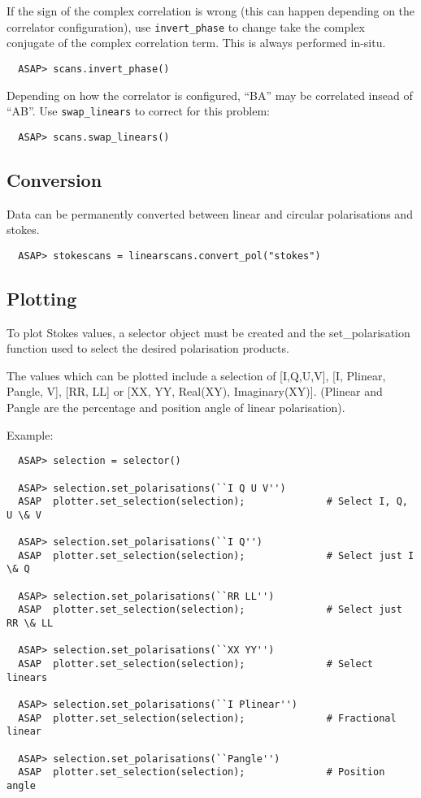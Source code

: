 \documentclass[11pt]{article}
\newcommand{\cmd}[1]{{\tt #1}}
\begin{document}
If the sign of the complex correlation is wrong (this can happen
depending on the correlator configuration), use \cmd{invert\_phase} to
change take the complex conjugate of the complex correlation
term. This is always performed in-situ.

\begin{verbatim}
  ASAP> scans.invert_phase()
\end{verbatim}

Depending on how the correlator is configured, ``BA'' may be
correlated insead of ``AB''. Use \cmd{swap\_linears} to correct for
this problem:

\begin{verbatim}
  ASAP> scans.swap_linears()
\end{verbatim}

\subsection{Conversion}
\label{sec:polconv}

Data can be permanently converted between linear and circular
polarisations and stokes.

\begin{verbatim}
  ASAP> stokescans = linearscans.convert_pol("stokes")
\end{verbatim}


\subsection{Plotting}
\label{sec:polplot}

To plot Stokes values, a selector object
must be created and the set\_polarisation function used to select the
desired polarisation products.

The values which can be plotted include a selection of [I,Q,U,V], [I,
Plinear, Pangle, V], [RR, LL] or [XX, YY, Real(XY),
Imaginary(XY)]. (Plinear and Pangle are the percentage and position
angle of linear polarisation).

Example:

\begin{verbatim}
  ASAP> selection = selector()

  ASAP> selection.set_polarisations(``I Q U V'')
  ASAP  plotter.set_selection(selection);              # Select I, Q, U \& V

  ASAP> selection.set_polarisations(``I Q'')
  ASAP  plotter.set_selection(selection);              # Select just I \& Q

  ASAP> selection.set_polarisations(``RR LL'')
  ASAP  plotter.set_selection(selection);              # Select just RR \& LL

  ASAP> selection.set_polarisations(``XX YY'')
  ASAP  plotter.set_selection(selection);              # Select linears

  ASAP> selection.set_polarisations(``I Plinear'')
  ASAP  plotter.set_selection(selection);              # Fractional linear

  ASAP> selection.set_polarisations(``Pangle'')
  ASAP  plotter.set_selection(selection);              # Position angle

\end{verbatim}
\end{document}
